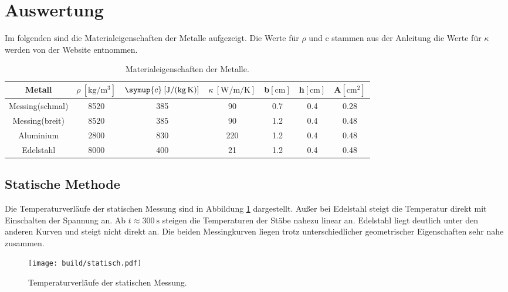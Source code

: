 \section{Auswertung}
\label{sec:Auswertung}
Im folgenden sind die Materialeigenschaften der Metalle aufgezeigt. Die Werte
für $ρ$ und c stammen aus der Anleitung\cite{Anleitung} die
Werte für $κ$ werden von der Website \cite{wärmeleitung} entnommen.
\begin{table}
      \centering
      \caption{Materialeigenschaften der Metalle.}
      \label{tab:mateig}
      \begin{tabular}{c S[table-format=4.0] S[table-format=3.0] S[table-format=3.0] S[table-format=1.1] S[table-format=1.1] S[table-format=1.2]}
            \toprule
            {Metall} & {$ρ \: [\si{\kilo\gram\per\cubic\meter}]$} &
            {$\symup{c} \: [\si{\joule\per\kilo\gram\per\kelvin}]$} &
            {$κ \: [\si{\watt\per\meter\per\kelvin}]$} &
            {b\:$[\si{\centi\metre}]$} &
            {h\:$[\si{\centi\metre}]$} &
            {A\:$[\si{\centi\metre\squared}]$}
            \\
            \midrule
            Messing(schmal) & 8520 & 385 &  90 & 0.7 & 0.4 & 0.28 \\
            Messing(breit)  & 8520 & 385 &  90 & 1.2 & 0.4 & 0.48 \\
            Aluminium       & 2800 & 830 & 220 & 1.2 & 0.4 & 0.48 \\
            Edelstahl       & 8000 & 400 &  21 & 1.2 & 0.4 & 0.48 \\
            \bottomrule
      \end{tabular}
\end{table}

\subsection{Statische Methode}
\label{sec:statisch}
Die Temperaturverläufe der statischen Messung sind in Abbildung \ref{fig:statisch}
dargestellt. Außer bei Edelstahl steigt die Temperatur direkt mit
Einschalten der Spannung an. Ab $t \approx \SI{300}{\second}$ steigen die Temperaturen
der Stäbe nahezu linear an. Edelstahl liegt deutlich unter den anderen Kurven und
steigt nicht direkt an. Die beiden Messingkurven liegen trotz unterschiedlicher
geometrischer Eigenschaften sehr nahe zusammen.
\begin{figure}
      \centering
      \texttt{[image: build/statisch.pdf]}
      \caption{Temperaturverläufe der statischen Messung.}
      \label{fig:statisch}
\end{figure}
\newpage

